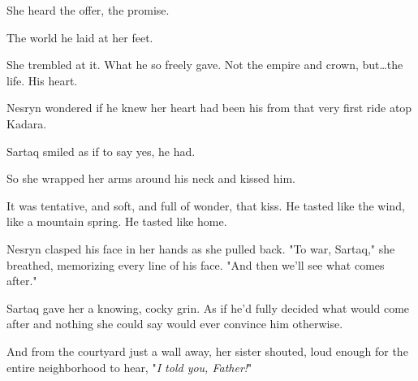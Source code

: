 She heard the offer, the promise.

The world he laid at her feet.

She trembled at it.
What he so freely gave.
Not the empire and crown, but\ldots the life.
His heart.

Nesryn wondered if he knew her heart had been his from that very first ride atop Kadara.

Sartaq smiled as if to say yes, he had.

So she wrapped her arms around his neck and kissed him.

It was tentative, and soft, and full of wonder, that kiss.
He tasted like the wind, like a mountain spring.
He tasted like home.

Nesryn clasped his face in her hands as she pulled back.
"To war, Sartaq," she breathed, memorizing every line of his face.
"And then we'll see what comes after."

Sartaq gave her a knowing, cocky grin.
As if he'd fully decided what would come after and nothing she could say would ever convince him otherwise.

And from the courtyard just a wall away, her sister shouted, loud enough for the entire neighborhood to hear, "\emph{I told you, Father!}"

